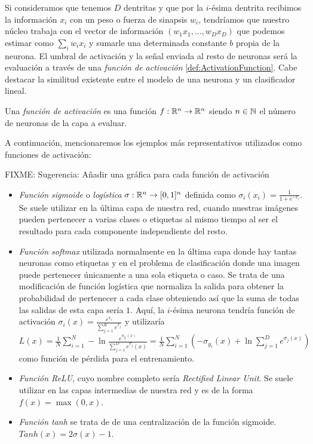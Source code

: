 Si consideramos que tenemos $D$ dentritas y que por la $i$-ésima dentrita recibimos la información $x_i$ con un peso o fuerza de sinapsis $w_i$, tendríamos que nuestro núcleo trabaja con el vector de información $(w_1 x_1,...,w_D x_D)$ que podemos estimar como $\sum_i w_i x_i $ y sumarle una determinada constante $b$ propia de la neurona. El umbral de activación y la señal enviada al resto de neuronas será la evaluación a través de una \emph{función de activación} \autoref{def:ActivationFunction}. Cabe destacar la similitud existente entre el modelo de una neurona y un clasificador lineal.\newline

\begin{definicion}\label{def:ActivationFunction}
Una \emph{función de activación} es una función $f: \mathbb{R}^n \to \mathbb{R}^n$ siendo $n\in\mathbb{N}$ el número de neuronas de la capa a evaluar.
\end{definicion}

A continuación, mencionaremos los ejemplos más representativos utilizados como funciones de activación:

FIXME: Sugerencia: Añadir una gráfica para cada función de activación
\begin{itemize}
\item \emph{Función sigmoide} o \emph{logística} $\sigma: \mathbb{R}^n \to [0,1]^n$ definida como $\sigma_i(x_i)=\frac{1}{1+e^{-x_i}} $. Se suele utilizar en la última capa de nuestra red, cuando nuestras imágenes pueden pertenecer a varias clases o etiquetas al mismo tiempo al ser el resultado para cada componente independiente del resto.
\item \emph{Función softmax} utilizada normalmente en la última capa donde hay tantas neuronas como etiquetas y en el problema de clasificación donde una imagen puede pertenecer únicamente a una sola etiqueta o caso. Se trata de una modificación de función logística que normaliza la salida para obtener la probabilidad de pertenecer a cada clase obteniendo así que la suma de todas las salidas de esta capa sería $1$. Aquí, la $i$-ésima neurona tendría función de activación $\sigma_i(x)=\frac{e^{x_i}}{\sum_{j=1}^K e^{x_j}}$ y utilizaría $L(x)=\frac{1}{N}\sum_{i=1}^N -\ln \frac{e^{\sigma_{y_i}(x)}}{\sum_{j=1}^D e^{\sigma_j}(x)}=\frac{1}{N}\sum_{i=1}^N (-{\sigma_{y_i}(x)}+\ln \sum_{j=1}^D e^{\sigma_j(x)})$ como función de pérdida para el entrenamiento.
\item \emph{Función ReLU}, cuyo nombre completo sería \emph{Rectified Linear Unit}. Se suele utilizar en las capas intermedias de nuestra red y es de la forma $f(x)=\max(0,x)$.
\item \emph{Función tanh} se trata de de una centralización de la función sigmoide. $Tanh(x)=2\sigma(x)-1$.
\end{itemize}

